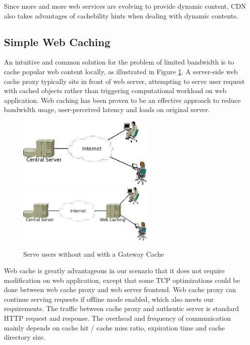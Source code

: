 Since more and more web services are evolving to provide dynamic content, CDN also takes advantages of cachebility hints when dealing with dynamic contents\cite{dilley2002globally}. 


\subsection{Simple Web Caching}
An intuitive and common solution for the problem of limited bandwidth is to cache popular web content locally, as illustrated in Figure \ref{with_cache}.
A server-side web cache proxy typically sits in front of web server, attempting to serve user request with cached objects rather than triggering computational workload on web application. Web caching has been proven to be an effective approach to reduce bandwidth usage, user-perceived latency and loads on original server\cite{davison2001web}.

\begin{figure}[h]
\centering
\includegraphics[width=0.6\textwidth]{../images/without_caching.jpeg}
\includegraphics[width=0.6\textwidth]{../images/with_caching.jpeg}
\caption{Serve users without and with a Gateway Cache}
\label{with_cache}
\end{figure}

Web cache is greatly advantageous in our scenario that it does not require modification on web application, except that some TCP optimizations could be done between web cache proxy and web server frontend. Web cache proxy can continue serving requests if offline mode enabled, which also meets our requirements. The traffic between cache proxy and authentic server is standard HTTP request and response. The overhead and frequency of communication mainly depends on cache hit / cache miss ratio, expiration time and cache directory size.


